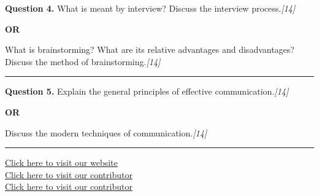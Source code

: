 \documentclass[11pt,a4paper]{article}
\newcommand{\pts}[1]{\hfill   \textit{[#1]}}
\begin{document}
\noindent   \textbf{Question 4.}
What is meant by interview? Discuss the interview process.\pts{14}

\centerline{   \textbf{OR}}

What is brainstorming? What are its relative advantages and disadvantages? Discuss the method of brainstorming.\pts{14}

\medskip\rule{\linewidth}{0.2pt}




\noindent   \textbf{Question 5.}
Explain the general principles of effective communication.\pts{14}

\centerline{   \textbf{OR}}

Discuss the modern techniques of communication.\pts{14}

\vfill
\rule{\linewidth}{0.4pt}

\begin{center}\small
\href{https://bhu-exam.vercel.app/}{Click here to visit our website}\\[4pt]
\href{https://me-aryan.vercel.app/}{Click here to visit our contributor}\\[4pt]
\href{https://quashan-me.vercel.app/}{Click here to visit our contributor}
\end{center}
\end{document}
